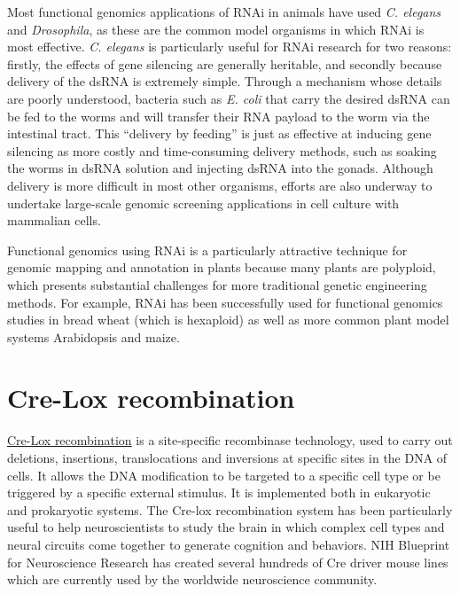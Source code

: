 Most functional genomics applications of RNAi in animals have used \emph{C. elegans} and \emph{Drosophila}, as these are the common model organisms in which RNAi is most effective. \emph{C. elegans} is particularly useful for RNAi research for two reasons: firstly, the effects of gene silencing are generally heritable, and secondly because delivery of the dsRNA is extremely simple. Through a mechanism whose details are poorly understood, bacteria such as \emph{E. coli} that carry the desired dsRNA can be fed to the worms and will transfer their RNA payload to the worm via the intestinal tract. This ``delivery by feeding'' is just as effective at inducing gene silencing as more costly and time-consuming delivery methods, such as soaking the worms in dsRNA solution and injecting dsRNA into the gonads. Although delivery is more difficult in most other organisms, efforts are also underway to undertake large-scale genomic screening applications in cell culture with mammalian cells.

Functional genomics using RNAi is a particularly attractive technique for genomic mapping and annotation in plants because many plants are polyploid, which presents substantial challenges for more traditional genetic engineering methods. For example, RNAi has been successfully used for functional genomics studies in bread wheat (which is hexaploid) as well as more common plant model systems Arabidopsis and maize.

\hypertarget{cre-lox-recombination}{%
\section{Cre-Lox recombination}\label{cre-lox-recombination}}

\href{https://en.wikipedia.org/wiki/Cre-Lox_recombination}{Cre-Lox recombination} is a site-specific recombinase technology, used to carry out deletions, insertions, translocations and inversions at specific sites in the DNA of cells. It allows the DNA modification to be targeted to a specific cell type or be triggered by a specific external stimulus. It is implemented both in eukaryotic and prokaryotic systems. The Cre-lox recombination system has been particularly useful to help neuroscientists to study the brain in which complex cell types and neural circuits come together to generate cognition and behaviors. NIH Blueprint for Neuroscience Research has created several hundreds of Cre driver mouse lines which are currently used by the worldwide neuroscience community.

